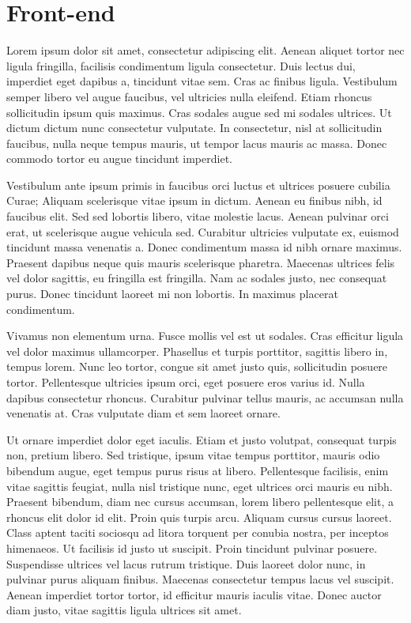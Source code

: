 \documentclass[letterpaper,10pt,english]{sphinxmanual}
\begin{document}
\chapter{Front-end}
\label{front-end::doc}\label{front-end:front-end}
Lorem ipsum dolor sit amet, consectetur adipiscing elit. Aenean aliquet tortor nec ligula fringilla, facilisis condimentum ligula consectetur. Duis lectus dui, imperdiet eget dapibus a, tincidunt vitae sem. Cras ac finibus ligula. Vestibulum semper libero vel augue faucibus, vel ultricies nulla eleifend. Etiam rhoncus sollicitudin ipsum quis maximus. Cras sodales augue sed mi sodales ultrices. Ut dictum dictum nunc consectetur vulputate. In consectetur, nisl at sollicitudin faucibus, nulla neque tempus mauris, ut tempor lacus mauris ac massa. Donec commodo tortor eu augue tincidunt imperdiet.

Vestibulum ante ipsum primis in faucibus orci luctus et ultrices posuere cubilia Curae; Aliquam scelerisque vitae ipsum in dictum. Aenean eu finibus nibh, id faucibus elit. Sed sed lobortis libero, vitae molestie lacus. Aenean pulvinar orci erat, ut scelerisque augue vehicula sed. Curabitur ultricies vulputate ex, euismod tincidunt massa venenatis a. Donec condimentum massa id nibh ornare maximus. Praesent dapibus neque quis mauris scelerisque pharetra. Maecenas ultrices felis vel dolor sagittis, eu fringilla est fringilla. Nam ac sodales justo, nec consequat purus. Donec tincidunt laoreet mi non lobortis. In maximus placerat condimentum.

Vivamus non elementum urna. Fusce mollis vel est ut sodales. Cras efficitur ligula vel dolor maximus ullamcorper. Phasellus et turpis porttitor, sagittis libero in, tempus lorem. Nunc leo tortor, congue sit amet justo quis, sollicitudin posuere tortor. Pellentesque ultricies ipsum orci, eget posuere eros varius id. Nulla dapibus consectetur rhoncus. Curabitur pulvinar tellus mauris, ac accumsan nulla venenatis at. Cras vulputate diam et sem laoreet ornare.

Ut ornare imperdiet dolor eget iaculis. Etiam et justo volutpat, consequat turpis non, pretium libero. Sed tristique, ipsum vitae tempus porttitor, mauris odio bibendum augue, eget tempus purus risus at libero. Pellentesque facilisis, enim vitae sagittis feugiat, nulla nisl tristique nunc, eget ultrices orci mauris eu nibh. Praesent bibendum, diam nec cursus accumsan, lorem libero pellentesque elit, a rhoncus elit dolor id elit. Proin quis turpis arcu. Aliquam cursus cursus laoreet. Class aptent taciti sociosqu ad litora torquent per conubia nostra, per inceptos himenaeos. Ut facilisis id justo ut suscipit. Proin tincidunt pulvinar posuere. Suspendisse ultrices vel lacus rutrum tristique. Duis laoreet dolor nunc, in pulvinar purus aliquam finibus. Maecenas consectetur tempus lacus vel suscipit. Aenean imperdiet tortor tortor, id efficitur mauris iaculis vitae. Donec auctor diam justo, vitae sagittis ligula ultrices sit amet.
\end{document}

